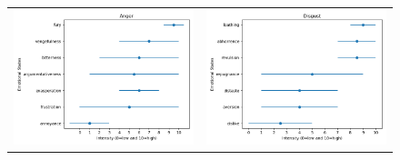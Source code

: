 \begin{figure}[ht]
\hspace*{-1.25cm}
    \begin{tabular}{cc}
    
        \includegraphics[scale=0.5]{Images/AtlasEmotionalStatesGraphics/Figure_anger.png} & \includegraphics[scale=0.5]{Images/AtlasEmotionalStatesGraphics/Figure_Disgust.png} \\

\end{tabular}
\end{figure}
